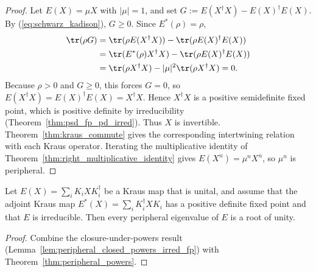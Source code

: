 \begin{proof}\leanok
    Let $E(X)=\mu X$ with $|\mu|=1$, and set
    $G:=E(X^\dagger X)-E(X)^\dagger E(X)$.
    By (\ref{eq:schwarz_kadison}), $G\geq0$.
    Since $E^*(\rho)=\rho$,
    \begin{align}
        \tr(\rho G)
         & =\tr(\rho E(X^\dagger X))
        -\tr(\rho E(X)^\dagger E(X)) \notag \\
         & =\tr(E^*(\rho)X^\dagger X)
        -\tr(\rho E(X)^\dagger E(X)) \notag \\
         & =\tr(\rho X^\dagger X)
        -|\mu|^2\tr(\rho X^\dagger X)
        =0.
    \end{align}
    Because $\rho>0$ and $G\geq0$, this forces $G=0$, so
    $E(X^\dagger X)=E(X)^\dagger E(X)=X^\dagger X$.
    Hence $X^\dagger X$ is a positive semidefinite fixed point, which is
    positive definite by irreducibility
    (Theorem~\ref{thm:psd_fp_pd_irred}). Thus $X$ is invertible.
    Theorem~\ref{thm:kraus_commute} gives the corresponding
    intertwining relation with each Kraus operator. Iterating the
    multiplicative identity of
    Theorem~\ref{thm:right_multiplicative_identity} gives
    $E(X^n)=\mu^nX^n$, so $\mu^n$ is peripheral.
\end{proof}

\begin{theorem}%
    \label{thm:peripheral_roots_irred_fp}
    \leanok
    Let $E(X)=\sum_iK_iXK_i^\dagger$ be a Kraus map that is
    unital, and assume that the adjoint Kraus map
    $E^*(X)=\sum_iK_i^\dagger XK_i$ has a positive definite fixed
    point and that $E$ is irreducible.
    Then every peripheral eigenvalue of $E$ is a root of unity.
\end{theorem}

\begin{proof}\leanok
    Combine the closure-under-powers result
    (Lemma~\ref{lem:peripheral_closed_powers_irred_fp})
    with Theorem~\ref{thm:peripheral_powers}.
\end{proof}

